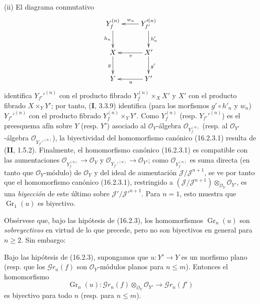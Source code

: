 \noindent(ii) El diagrama conmutativo
\[
  \xymatrix{
    Y_f^{(n)} \ar[d]_{h_n}
      & Y_{f'}'^{(n)} \ar[d]^-{h'_n} \ar[l]_{w_n} \\
    X \ar[d]_g
      & X' \ar[d]^{g'} \ar[l]^v \\
    Y
      & Y' \ar[l]^u
  }
\]
identifica $Y_{f'}'^{(n)}$ con el producto fibrado $Y_f^{(n)}\times_X X'$ y $X'$ con el producto fibrado
$X\times_Y Y'$; por tanto, (\textbf I, 3.3.9) identifica (para los morfismos
$g'\circ h'_n$ y $w_n$) $Y_{f'}'^{(n)}$ con el producto fibrado
$Y_f^{(n)}\times_Y Y'$. Como $Y_f^{(n)}$ (resp. $Y_{f'}'^{(n)}$) es el
preesquema afín sobre $Y$ (resp. $Y'$) asociado al
$\mathcal{O}_Y$-álgebra $\mathcal{O}_{Y_f^{(n)}}$ (resp. al
$\mathcal{O}_{Y'}$-álgebra $\mathcal{O}_{Y_{f'}'^{(n)}}$), la biyectividad del
homomorfismo canónico (16.2.3.1) resulta de (\textbf{II}, 1.5.2).
Finalmente, el homomorfismo canónico (16.2.3.1) es compatible con las
aumentaciones
$\mathcal{O}_{Y_f^{(n)}}\to\mathcal{O}_Y$ y
$\mathcal{O}_{Y_{f'}'^{(n)}}\to\mathcal{O}_{Y'}$; como
$\mathcal{O}_{Y_f^{(n)}}$ es suma directa (en tanto que
$\mathcal{O}_Y$-módulo) de $\mathcal{O}_Y$ y del ideal de aumentación
$\mathscr J/\mathscr J^{n+1}$, se ve por tanto que el homomorfismo canónico
(16.2.3.1), restringido a
$(\mathscr J/\mathscr J^{n+1})\otimes_{\mathcal{O}_Y}\mathcal{O}_{Y'}$,
es una \emph{biyección} de este último sobre
$\mathscr J'/\mathscr J'^{n+1}$. Para $n=1$, esto muestra que
$\operatorname{Gr}_1(u)$ es biyectivo.

Obsérvese que, bajo las hipótesis de (16.2.3), los homomorfismos
$\operatorname{Gr}_n(u)$ son \emph{sobreyectivos} en virtud de lo que precede, pero no
son biyectivos en general para $n\geq 2$. Sin embargo:

\begin{corollary}[16.2.4]
\label{IV.16.2.4}
Bajo las hipótesis de \textup{(16.2.3)}, supongamos que $u:Y'\to Y$ es un morfismo
plano \textup{(resp.} que los $\mathscr{G}r_n(f)$ son $\mathcal{O}_Y$-módulos
planos para $n\leq m$\textup{)}. Entonces el homomorfismo
\[
  \operatorname{Gr}_n(u):
  \mathscr{G}r_n(f)\otimes_{\mathcal{O}_Y}\mathcal{O}_{Y'}
  \longrightarrow\mathscr{G}r_n(f')
\]
es biyectivo para todo $n$ \textup{(resp.} para $n\leq m$\textup{)}.
\end{corollary}


